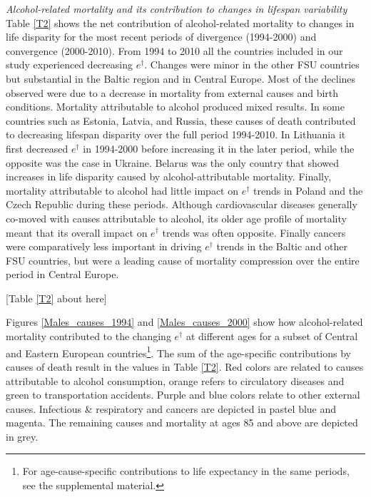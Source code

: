 \documentclass{article}
\begin{document}
\begin{spacing}{1.5}
\emph{Alcohol-related mortality and its contribution to changes in lifespan variability}\\

Table \ref{T2} shows the net contribution of alcohol-related mortality to changes in life disparity for the most recent periods of divergence (1994-2000) and convergence (2000-2010). From 1994 to 2010 all the countries included in our study experienced decreasing $e^\dagger$. \textcolor[rgb]{1,0,0}{Changes were minor in the other FSU countries but substantial in the Baltic region and in Central Europe}. Most of the declines observed were due to a decrease in mortality from external causes and birth conditions. Mortality attributable to alcohol produced mixed results. In some countries such as Estonia, Latvia, and Russia, these causes of death contributed to decreasing lifespan disparity over the full period 1994-2010. In Lithuania it first decreased $e^\dagger$ in 1994-2000 before increasing it in the later period, while the opposite was the case in Ukraine. Belarus was the only country that showed increases in life disparity caused by alcohol-attributable mortality. Finally, mortality attributable to alcohol had little impact on $e^\dagger$ trends in Poland and the Czech Republic during these periods. \textcolor[rgb]{1,0,0}{Although cardiovascular diseases generally co-moved with causes attributable to alcohol, its older age profile of mortality meant that its overall impact on $e^\dagger$ trends was often opposite. Finally cancers were comparatively less important in driving $e^\dagger$ trends in the Baltic and other FSU countries, but were a leading cause of mortality compression over the entire period in Central Europe.}  

\begin{center}
[Table  \ref{T2} about here]\\
\end{center}


Figures \ref{Males_causes_1994} and \ref{Males_causes_2000} show how alcohol-related mortality contributed to the changing $e^\dagger$ at different ages for a subset of Central and Eastern European countries\footnote{For age-cause-specific contributions to life expectancy in the same periods, see the supplemental material.}. The sum of the age-specific contributions by causes of death result in the values in Table \ref{T2}. Red colors are related to causes attributable to alcohol consumption, orange refers to circulatory diseases and green to transportation accidents. Purple and blue colors relate to other external causes. Infectious \& respiratory and cancers are depicted in pastel blue and magenta. The remaining causes and mortality at ages 85 and above are depicted in grey.\\


\end{spacing}
\end{document}
